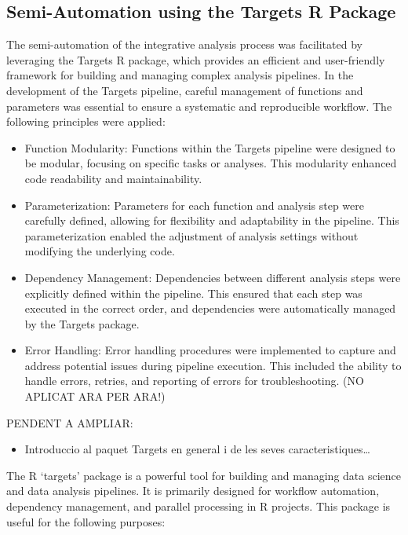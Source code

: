 \documentclass[a4paper, nobind]{templates/ociamthesis}
\providecommand{\tightlist}{%
  \setlength{\itemsep}{0pt}\setlength{\parskip}{0pt}}
\begin{document}
\hypertarget{semi-automation-using-the-targets-r-package}{%
\subsection{Semi-Automation using the Targets R Package}\label{semi-automation-using-the-targets-r-package}}

The semi-automation of the integrative analysis process was facilitated by leveraging the Targets R package, which provides an efficient and user-friendly framework for building and managing complex analysis pipelines. In the development of the Targets pipeline, careful management of functions and parameters was essential to ensure a systematic and reproducible workflow. The following principles were applied:

\begin{itemize}
\item
  Function Modularity: Functions within the Targets pipeline were designed to be modular, focusing on specific tasks or analyses. This modularity enhanced code readability and maintainability.
\item
  Parameterization: Parameters for each function and analysis step were carefully defined, allowing for flexibility and adaptability in the pipeline. This parameterization enabled the adjustment of analysis settings without modifying the underlying code.
\item
  Dependency Management: Dependencies between different analysis steps were explicitly defined within the pipeline. This ensured that each step was executed in the correct order, and dependencies were automatically managed by the Targets package.
\item
  Error Handling: Error handling procedures were implemented to capture and address potential issues during pipeline execution. This included the ability to handle errors, retries, and reporting of errors for troubleshooting. (NO APLICAT ARA PER ARA!)
\end{itemize}

PENDENT A AMPLIAR:

\begin{itemize}
\tightlist
\item
  Introduccio al paquet Targets en general i de les seves caracteristiques\ldots{}
\end{itemize}

The R `targets' package is a powerful tool for building and managing data science and data analysis pipelines. It is primarily designed for workflow automation, dependency management, and parallel processing in R projects. This package is useful for the following purposes:
\end{document}
